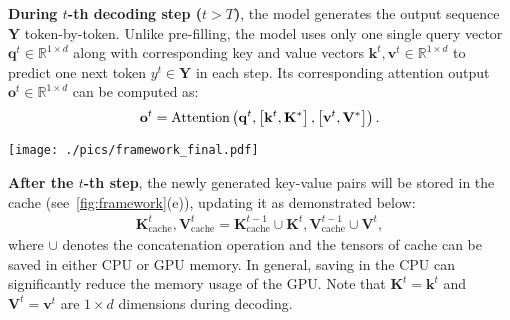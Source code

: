 \textbf{During $t$-th decoding step  ($t > T$)}, the model generates the output sequence $\mathbf{Y}$ token-by-token. Unlike pre-filling, the model uses only one single query vector $\mathbf{q}^{t} \in \mathbb{R}^{1 \times d}$ along with corresponding key and value vectors $\mathbf{k}^{t}, \mathbf{v}^{t} \in \mathbb{R}^{1 \times d}$ to predict one next token $y^{t} \in \mathbf{Y}$ in each step. Its corresponding attention output $\mathbf{o}^{t} \in \mathbb{R}^{1 \times d}$ can be computed as:
\begin{equation}
\vspace{-3pt}
\begin{aligned}
\mathbf{o}^{t} = \text{Attention}\left( \mathbf{q}^{t}, \left[ \mathbf{k}^{t}, \mathbf{K}^{*} \right], \left[ \mathbf{v}^{t}, \mathbf{V}^{*} \right] \right).
\end{aligned}
\end{equation}

\begin{figure*}[!ht] 
    \centering
        \texttt{[image: ./pics/framework\_final.pdf]}
    \caption{. Sliding window attention stores historical KV pairs in a cache and reuses them for subsequent window inference. Based on this, \name first identifies the anchor tokens within the window and then constructs the activation-aware \pq. This \pq is subsequently used to retrieve the top-k relevant KV pairs from the cache during the pre-filling stage. During the decoding stage, the cut-off mechanism dynamically adjusts the number of recalled KV pairs based on the distribution of key-values at each layer, ensuring the inclusion of relevant pairs while minimizing the influence of irrelevant ones. The cache can be stored in the CPU and transferred to the GPU when needed. All our contributions are highlighted in {red}. }
    \label{fig:framework}
\vspace{-0.5em}
\end{figure*}

\textbf{After the $t$-th step}, the newly generated key-value pairs will be stored in the cache (see~\cref{fig:framework}(e)), updating it as demonstrated below:
\begin{equation}
\begin{aligned}
\mathbf{K}^{t}_{\text{cache}},\mathbf{V}^{t}_{\text{cache}} = \mathbf{K}^{t-1}_{\text{cache}}\cup \mathbf{K}^{t}, \mathbf{V}^{t-1}_{\text{cache}}\cup \mathbf{V}^{t},
\end{aligned}
\end{equation}
where $\cup$ denotes the concatenation operation and the tensors of cache can be saved in either CPU or GPU memory. In general, saving in the CPU can significantly reduce the memory usage of the GPU. Note that $\mathbf{K}^t=\mathbf{k}^t$ and $\mathbf{V}^t=\mathbf{v}^t$ are $1\times d$ dimensions during decoding.


